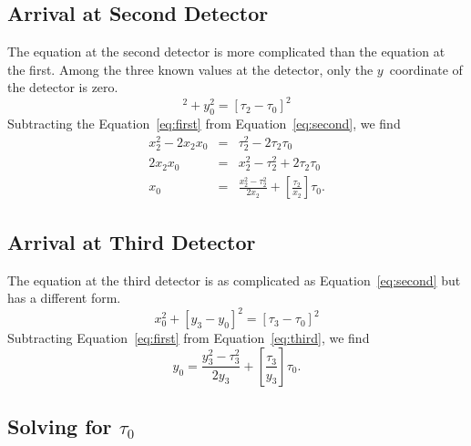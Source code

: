 \documentclass[twocolumn]{article}
\begin{document}
\subsection{Arrival at Second Detector}

The equation at the second detector is more complicated than the equation at
the first.  Among the three known values at the detector, only the
$y$~coordinate of the detector is zero.
\begin{equation}
   [x_2 - x_0]^2 + y_0^2 = [\tau_2 - \tau_0]^2
   \label{eq:second}
\end{equation}
Subtracting the Equation~\ref{eq:first} from Equation~\ref{eq:second}, we find
\begin{eqnarray}
   \nonumber
   x_2^2 - 2 x_2 x_0 &=& \tau_2^2 - 2 \tau_2 \tau_0\\
   \nonumber
   2 x_2 x_0 &=& x_2^2 - \tau_2^2 + 2 \tau_2 \tau_0\\
   x_0 &=& \frac{x_2^2 - \tau_2^2}{2 x_2} + \left[\frac{\tau_2}{x_2}\right]
   \tau_0.
   \label{eq:t-x}
\end{eqnarray}

\subsection{Arrival at Third Detector}

The equation at the third detector is as complicated as
Equation~\ref{eq:second} but has a different form.
\begin{equation}
   x_0^2 + [y_3 - y_0]^2 = [\tau_3 - \tau_0]^2
   \label{eq:third}
\end{equation}
Subtracting Equation~\ref{eq:first} from Equation~\ref{eq:third}, we find
\begin{equation}
   y_0 = \frac{y_3^2 - \tau_3^2}{2 y_3} + \left[\frac{\tau_3}{y_3}\right]
   \tau_0.
   \label{eq:t-y}
\end{equation}

\subsection{Solving for $\tau_0$}
\end{document}
